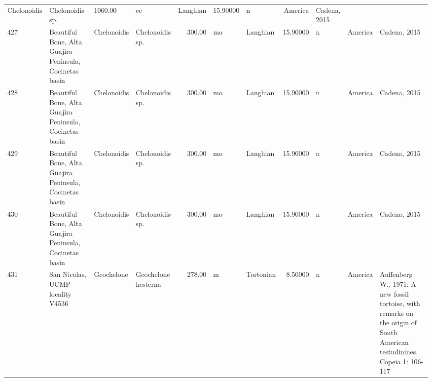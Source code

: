\documentclass[]{article}
\begin{document}
\begin{longtable}[]{@{}llllrllrlll@{}}
Chelonoidis & Chelonoidis sp. & 1060.00 & ec & Langhian & 15.90000 & n &
America & Cadena, 2015\tabularnewline
427 & Beautiful Bone, Alta Guajira Peninsula, Cocinetas basin &
Chelonoidis & Chelonoidis sp. & 300.00 & mo & Langhian & 15.90000 & n &
America & Cadena, 2015\tabularnewline
428 & Beautiful Bone, Alta Guajira Peninsula, Cocinetas basin &
Chelonoidis & Chelonoidis sp. & 300.00 & mo & Langhian & 15.90000 & n &
America & Cadena, 2015\tabularnewline
429 & Beautiful Bone, Alta Guajira Peninsula, Cocinetas basin &
Chelonoidis & Chelonoidis sp. & 300.00 & mo & Langhian & 15.90000 & n &
America & Cadena, 2015\tabularnewline
430 & Beautiful Bone, Alta Guajira Peninsula, Cocinetas basin &
Chelonoidis & Chelonoidis sp. & 300.00 & mo & Langhian & 15.90000 & n &
America & Cadena, 2015\tabularnewline
431 & San Nicolas, UCMP locality V4536 & Geochelone & Geochelone
hesterna & 278.00 & m & Tortonian & 8.50000 & n & America & Auffenberg
W., 1971: A new fossil tortoise, with remarks on the origin of South
American testudinines. Copeia 1: 106-117\tabularnewline
\bottomrule
\end{longtable}
\end{document}
